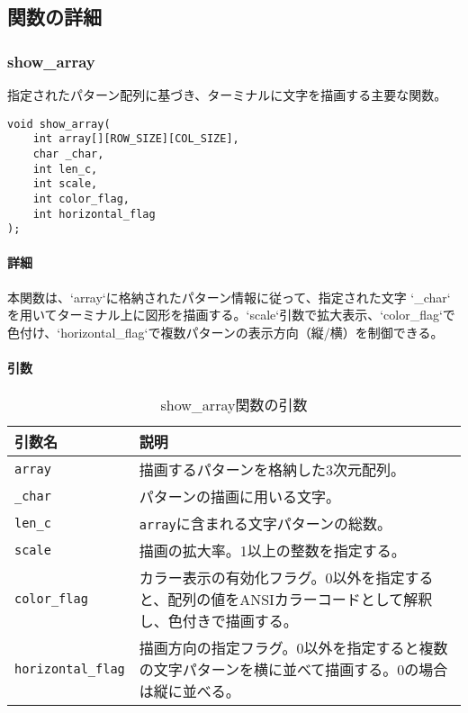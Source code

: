 \documentclass[uplatex]{jsarticle}
\begin{document}
\subsection{関数の詳細}

\subsubsection{show\_array}
指定されたパターン配列に基づき、ターミナルに文字を描画する主要な関数。
\begin{verbatim}
void show_array(
    int array[][ROW_SIZE][COL_SIZE],
    char _char,
    int len_c,
    int scale,
    int color_flag,
    int horizontal_flag
);
\end{verbatim}
\paragraph{詳細}
本関数は、`array`に格納されたパターン情報に従って、指定された文字 `\_char` を用いてターミナル上に図形を描画する。`scale`引数で拡大表示、`color\_flag`で色付け、`horizontal\_flag`で複数パターンの表示方向（縦/横）を制御できる。

\paragraph{引数}
\begin{table}[H]
    \centering
    \caption{show\_array関数の引数}
    \begin{tabular}{|l|p{9cm}|}
        \hline
        \textbf{引数名} & \textbf{説明} \\ \hline
        \texttt{array} & 描画するパターンを格納した3次元配列。 \\ \hline
        \texttt{\_char} & パターンの描画に用いる文字。 \\ \hline
        \texttt{len\_c} & \texttt{array}に含まれる文字パターンの総数。 \\ \hline
        \texttt{scale} & 描画の拡大率。1以上の整数を指定する。 \\ \hline
        \texttt{color\_flag} & カラー表示の有効化フラグ。0以外を指定すると、配列の値をANSIカラーコードとして解釈し、色付きで描画する。 \\ \hline
        \texttt{horizontal\_flag} & 描画方向の指定フラグ。0以外を指定すると複数の文字パターンを横に並べて描画する。0の場合は縦に並べる。 \\ \hline
    \end{tabular}
\end{table}
\end{document}
